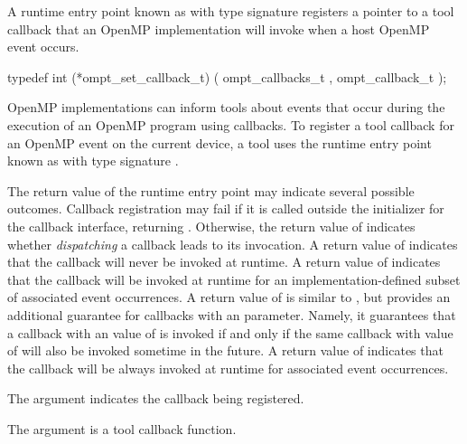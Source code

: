 \summary

A runtime entry point known as 
with type signature  registers a
pointer to a tool callback that an OpenMP implementation will invoke when a host
OpenMP event occurs.

\format

\begin{ccppspecific}
\begin{omptCallback}
typedef int (*ompt_set_callback_t) (
  ompt_callbacks_t ,
  ompt_callback_t 
);
\end{omptCallback}
\end{ccppspecific}


\descr

OpenMP implementations can inform tools about events that occur during
the execution of an OpenMP program using callbacks.
To register a tool callback for an OpenMP event on the current device,
a tool uses the runtime entry point
known as 
with type signature .

The return value of the  runtime entry point may indicate several possible
outcomes. Callback registration may fail if it is called outside the initializer for the
callback interface, returning .
Otherwise, the return value of 
indicates whether \emph{dispatching} a callback leads to its invocation.
A return value of  indicates that the callback
will never be invoked at runtime.
A return value of  indicates that the callback
will be invoked at runtime for an implementation-defined subset of
associated event occurrences.
A return value of  is similar to
, but provides an additional guarantee for
callbacks with an  parameter. Namely, it guarantees that a callback
with an  value of  is invoked if and only if
the same callback with  value of  will
also be invoked sometime in the future.
A return value of  indicates that the callback
will be always invoked at runtime for associated event occurrences.

\argdesc

The argument  indicates the callback being registered.

The argument  is a tool callback function.

